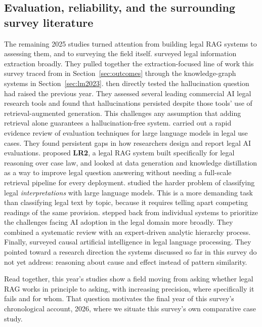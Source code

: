 \subsection{Evaluation, reliability, and the surrounding survey literature}

The remaining 2025 studies turned attention from building legal RAG systems to assessing them, and
to surveying the field itself. \citet{premasiri2025} surveyed legal information extraction broadly.
They pulled together the extraction-focused line of work this survey traced from
\citet{chalkidis2017} in Section~\ref{sec:outcomes} through the knowledge-graph systems in
Section~\ref{sec:lm2023}. \citet{magesh2025} then directly tested the hallucination question
\citet{dahl2024} had raised the previous year. They assessed several leading commercial AI legal
research tools and found that hallucinations persisted despite those tools' use of
retrieval-augmented generation. This challenges any assumption that adding retrieval alone
guarantees a hallucination-free system. \citet{kelsall2025} carried out a rapid evidence review of
evaluation techniques for large language models in legal use cases. They found persistent gaps in
how researchers design and report legal AI evaluations. \citet{benedetto2025} proposed
\textbf{LR2}, a legal RAG system built specifically for legal reasoning over case law, and
\citet{italiani2025} looked at data generation and knowledge distillation as a way to improve legal
question answering without needing a full-scale retrieval pipeline for every deployment.
\citet{dugac2025} studied the harder problem of classifying legal \emph{interpretations} with large
language models. This is a more demanding task than classifying legal text by topic, because it
requires telling apart competing readings of the same provision. \citet{kim2025} stepped back from
individual systems to prioritize the challenges facing AI adoption in the legal domain more broadly.
They combined a systematic review with an expert-driven analytic hierarchy process. Finally,
\citet{tritto2025} surveyed causal artificial intelligence in legal language processing. They
pointed toward a research direction the systems discussed so far in this survey do not yet address:
reasoning about cause and effect instead of pattern similarity.

Read together, this year's studies show a field moving from asking whether legal RAG works in
principle to asking, with increasing precision, where specifically it fails and for whom. That
question motivates the final year of this survey's chronological account, 2026, where we situate
this survey's own comparative case study.
